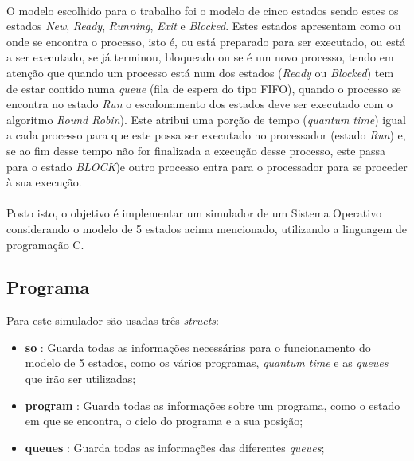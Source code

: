 \documentclass{article}
\begin{document}
\paragraph{}
O modelo escolhido para o trabalho foi o modelo de cinco estados sendo estes os estados \emph{New}, \emph{Ready}, \emph{Running}, \emph{Exit} e \emph{Blocked}. Estes estados apresentam como ou onde se encontra o processo, isto é, ou está preparado para ser executado, ou está a ser executado, se já terminou, bloqueado ou se é um novo processo, tendo em atenção que quando um processo está num dos estados (\emph{Ready} ou \emph{Blocked}) tem de estar contido numa \emph{queue} (fila de espera do tipo FIFO), quando o processo se encontra no estado \emph{Run} o escalonamento dos estados deve ser executado com o algoritmo \emph{Round Robin}). Este atribui uma porção de tempo (\emph{quantum time}) igual a cada processo para que este possa ser executado no processador (estado \emph{Run}) e, se ao fim desse tempo não for finalizada a execução desse processo, este passa para o estado \emph{BLOCK})e outro processo entra para o processador para se proceder à sua execução.
\vspace{-0.3cm}
\paragraph{}
Posto isto, o objetivo é implementar um simulador de um Sistema Operativo considerando o modelo de 5 estados acima mencionado, utilizando a linguagem de programação C.

\begin{center}
    \section*{Programa}
\end{center}
Para este simulador são usadas três \emph{structs}:

\begin{itemize}
    \item \textbf{so} : Guarda todas as informações necessárias para o funcionamento do modelo de 5 estados, como os vários programas, \emph{quantum time} e as \emph{queues} que irão ser utilizadas;
    \item \textbf{program} : Guarda todas as informações sobre um programa, como o estado em que se encontra, o ciclo do programa e a sua posição;
    \item \textbf{queues} : Guarda todas as informações das diferentes \emph{queues};
\end{itemize}
\vspace{-0.3cm}
\end{document}

